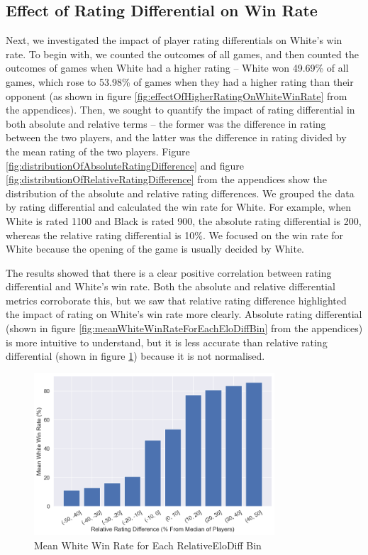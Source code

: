 \documentclass[a4paper, 11pt]{article}
\begin{document}
\subsection{Effect of Rating Differential on Win Rate}
Next, we investigated the impact of player rating differentials on White's win rate. To begin with, we counted the outcomes of all games, and then counted the outcomes of games when White had a higher rating -- White won 49.69\% of all games, which rose to 53.98\% of games when they had a higher rating than their opponent (as shown in figure \ref{fig:effectOfHigherRatingOnWhiteWinRate} from the appendices). Then, we sought to quantify the impact of rating differential in both absolute and relative terms -- the former was the difference in rating between the two players, and the latter was the difference in rating divided by the mean rating of the two players. Figure \ref{fig:distributionOfAbsoluteRatingDifference} and figure \ref{fig:distributionOfRelativeRatingDifference} from the appendices show the distribution of the absolute and relative rating differences. We grouped the data by rating differential and calculated the win rate for White. For example, when White is rated 1100 and Black is rated 900, the absolute rating differential is 200, whereas the relative rating differential is 10\%. We focused on the win rate for White because the opening of the game is usually decided by White.

The results showed that there is a clear positive correlation between rating differential and White's win rate. Both the absolute and relative differential metrics corroborate this, but we saw that relative rating difference highlighted the impact of rating on White's win rate more clearly. Absolute rating differential (shown in figure \ref{fig:meanWhiteWinRateForEachEloDiffBin} from the appendices) is more intuitive to understand, but it is less accurate than relative rating differential (shown in figure \ref{fig:meanWhiteWinRateForEachRelativeEloDiffBin}) because it is not normalised.

\begin{figure}[H]
    \centering
    \caption{Mean White Win Rate for Each RelativeEloDiff Bin}
    \label{fig:meanWhiteWinRateForEachRelativeEloDiffBin}
    \includegraphics[width=0.8\textwidth]{Mean White Win Rate for Each RelativeEloDiff Bin.png}
\end{figure}
\end{document}
